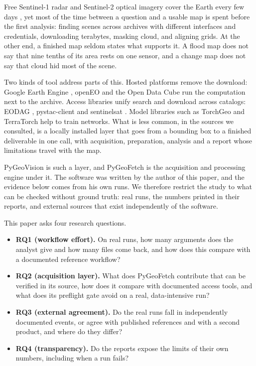 \documentclass[conference]{IEEEtran}
\begin{document}
Free Sentinel-1 radar and Sentinel-2 optical imagery cover the Earth every few days \cite{torres2012sentinel1,drusch2012sentinel2}, yet most of the time between a question and a usable map is spent before the first analysis: finding scenes across archives with different interfaces and credentials, downloading terabytes, masking cloud, and aligning grids. At the other end, a finished map seldom states what supports it. A flood map does not say that nine tenths of its area rests on one sensor, and a change map does not say that cloud hid most of the scene.

Two kinds of tool address parts of this. Hosted platforms remove the download: Google Earth Engine \cite{gorelick2017gee}, openEO \cite{schramm2021openeo} and the Open Data Cube \cite{lewis2017datacube} run the computation next to the archive. Access libraries unify search and download across catalogs: EODAG \cite{eodag2026}, pystac-client \cite{pystacclient2026} and sentinelsat \cite{sentinelsat2026}. Model libraries such as TorchGeo \cite{stewart2022torchgeo} and TerraTorch \cite{gomes2025terratorch} help to train networks. What is less common, in the sources we consulted, is a locally installed layer that goes from a bounding box to a finished deliverable in one call, with acquisition, preparation, analysis and a report whose limitations travel with the map.

PyGeoVision \cite{appiahkubi2026pygeovision} is such a layer, and PyGeoFetch \cite{appiahkubi2025pygeofetch} is the acquisition and processing engine under it. The software was written by the author of this paper, and the evidence below comes from his own runs. We therefore restrict the study to what can be checked without ground truth: real runs, the numbers printed in their reports, and external sources that exist independently of the software.

This paper asks four research questions.

\begin{itemize}
\item \textbf{RQ1 (workflow effort).} On real runs, how many arguments does the analyst give and how many files come back, and how does this compare with a documented reference workflow?
\item \textbf{RQ2 (acquisition layer).} What does PyGeoFetch contribute that can be verified in its source, how does it compare with documented access tools, and what does its preflight gate avoid on a real, data-intensive run?
\item \textbf{RQ3 (external agreement).} Do the real runs fall in independently documented events, or agree with published references and with a second product, and where do they differ?
\item \textbf{RQ4 (transparency).} Do the reports expose the limits of their own numbers, including when a run fails?
\end{itemize}
\end{document}

